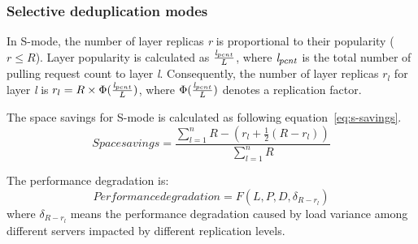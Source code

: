 \subsubsection{Selective deduplication modes}
In S-mode, the number of layer replicas \emph{r} is proportional to their popularity ($r \leq R$).
Layer popularity is calculated as $\frac{\emph{l}_{pcnt}}{L}$, 
where $\emph{l}_{pcnt}$ is the total number of pulling request count to layer \emph{l}.  
Consequently, the number of layer replicas $r_{l}$ for layer \emph{l} is
$r_{l} = R \times \Phi (\frac{\emph{l}_{pcnt}}{L})$, 
where $\Phi (\frac{\emph{l}_{pcnt}}{L})$ denotes a replication factor.

The space savings for S-mode is calculated as following equation~\ref{eq:s-savings}.
\begin{equation}\label{eq:s-savings}
Space savings = \frac{\sum\limits_{l=1}^n{R-(r_{l}+\frac{1}{2}(R-r_{l}))}}{\sum\limits_{l=1}^n{R}} 
\end{equation}

The performance degradation is:
  \begin{equation}\label{eq:s-pull}
Performance degradation =  F(L, P, D, \delta_{R-r_{l}})
 \end{equation}
where $\delta_{R-r_{l}}$ means 
the performance degradation caused by load variance among different servers impacted by different replication levels.
 